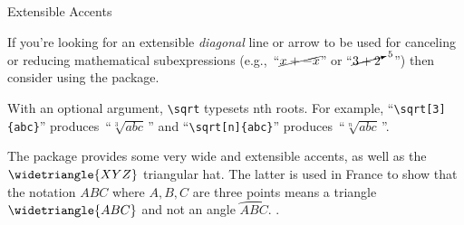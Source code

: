 \begin{symtable}{Extensible Accents}
\bigskip

\begin{tablenote}[\dag]
  If you're looking for an extensible \emph{diagonal} line or arrow to
  be used for canceling or reducing mathematical
  subexpressions
\ifhavecancel
  (e.g.,~``$\cancel{x + -x}$'' or ``$\cancelto{5}{3+2}\quad$'')
\fi
  then consider using the  package.
\end{tablenote}

\bigskip

\begin{tablenote}[\ddag]
  With an optional argument, \verb|\sqrt| typesets nth roots.  For
  example, ``\verb|\sqrt[3]{abc}|'' produces~``$\!\sqrt[3]{abc}$\,''
  and ``\verb|\sqrt[n]{abc}|'' produces~``$\!\sqrt[n]{abc}$\,''.
\end{tablenote}
\end{symtable}


The  package provides some very wide and extensible accents, as well as the $\widetriangle{XYZ}$ triangular hat. The latter is used in France to show that the notation $ABC$ where $A,B,C$ are three points means a triangle $\widetriangle{ABC}$ and not an 
angle $\wideparen{ABC}$.  \citep{ymath}.


